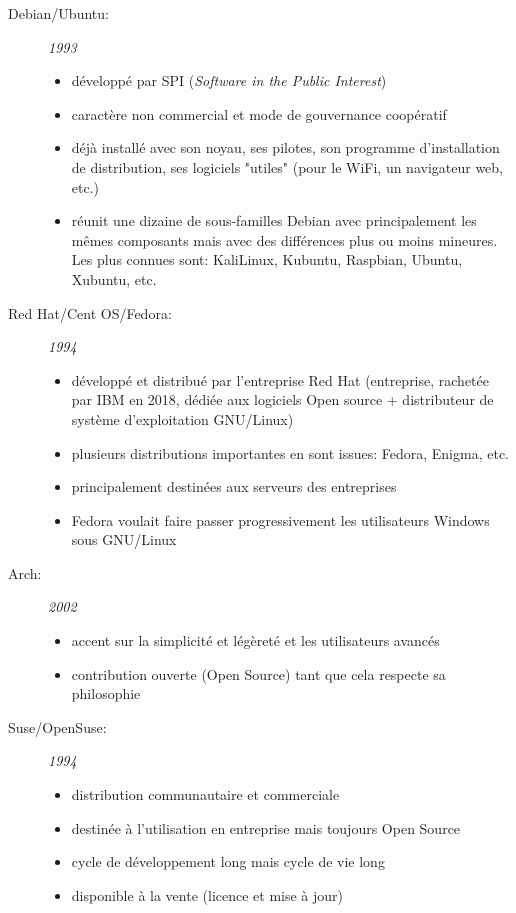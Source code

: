 \begin{description}
	\item[Debian/Ubuntu:] \textit{1993}
		\begin{itemize}
			\item développé par SPI (\textit{Software in the Public Interest})
			\item caractère non commercial et mode de gouvernance coopératif
			\item déjà installé avec son noyau, ses pilotes, son programme
				d'installation de distribution, ses logiciels "utiles" (pour le
				WiFi, un navigateur web, etc.)
			\item réunit une dizaine de sous-familles Debian avec
				principalement les mêmes composants mais avec des différences
				plus ou moins mineures. Les plus connues sont: KaliLinux,
				Kubuntu, Raspbian, Ubuntu, Xubuntu, etc.
		\end{itemize}

	\item[Red Hat/Cent OS/Fedora:] \textit{1994}
		\begin{itemize}
			\item développé et distribué par l'entreprise Red Hat (entreprise,
				rachetée par IBM en 2018, dédiée aux logiciels Open source +
				distributeur de système d'exploitation GNU/Linux)
			\item plusieurs distributions importantes en sont issues: Fedora,
				Enigma, etc.
			\item principalement destinées aux serveurs des entreprises
			\item Fedora voulait faire passer progressivement les utilisateurs
				Windows sous GNU/Linux
		\end{itemize}

	\item[Arch:] \textit{2002}
		\begin{itemize}
			\item accent sur la simplicité et légèreté et les utilisateurs
				avancés
			\item contribution ouverte (Open Source) tant que cela respecte sa
				philosophie
		\end{itemize}

	\item[Suse/OpenSuse:] \textit{1994}
		\begin{itemize}
			\item distribution communautaire et commerciale
			\item destinée à l'utilisation en entreprise mais toujours Open
				Source
			\item cycle de développement long mais cycle de vie long
			\item disponible à la vente (licence et mise à jour)
		\end{itemize}
\end{description}
